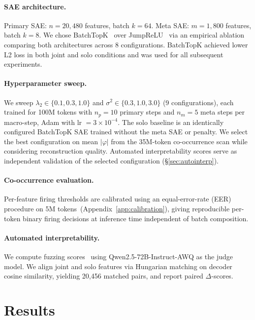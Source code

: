\documentclass{article} %
\begin{document}
\paragraph{SAE architecture.}
Primary SAE: $n = 20{,}480$ features, batch $k = 64$.
Meta SAE: $m = 1{,}800$ features, batch $k = 8$.
We chose BatchTopK~\citep{gao2024scaling} over JumpReLU~\citep{rajamanoharan2024jumping} via an empirical ablation comparing both
architectures across 8 configurations. BatchTopK achieved lower L2 loss in
both joint and solo conditions and was used for all subsequent experiments.

\paragraph{Hyperparameter sweep.}
We sweep $\lambda_2 \in \{0.1, 0.3, 1.0\}$ and
$\sigma^2 \in \{0.3, 1.0, 3.0\}$ (9 configurations), each trained for 100M
tokens with $n_p = 10$ primary steps and $n_m = 5$ meta steps per macro-step,
Adam with lr $= 3\times10^{-4}$.
The solo baseline is an identically configured BatchTopK SAE trained without the
meta SAE or penalty.
We select the best configuration on mean $|\varphi|$ from the 35M-token
co-occurrence scan while considering reconstruction quality. Automated interpretability scores serve as independent
validation of the selected configuration (\S\ref{sec:autointerp}).

\paragraph{Co-occurrence evaluation.}
Per-feature firing thresholds are calibrated using an equal-error-rate (EER)
procedure on 5M tokens~(Appendix~\ref{app:calibration}), giving reproducible
per-token binary firing decisions at inference time independent of batch composition.

\paragraph{Automated interpretability.}
We compute fuzzing scores~\citep{bills2023language,paulo2024autointerp} using
Qwen2.5-72B-Instruct-AWQ as the judge model.
We align joint and solo features via Hungarian matching on decoder cosine
similarity, yielding 20,456 matched pairs, and report paired $\Delta$-scores.

\section{Results}
\label{sec:results}
\end{document}
